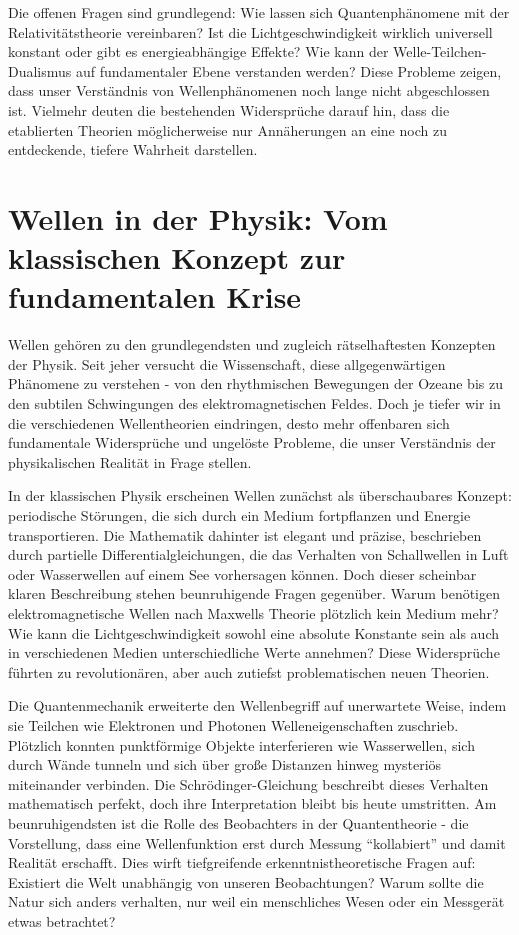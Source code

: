 Die offenen Fragen sind grundlegend: Wie lassen sich Quantenphänomene mit der Relativitätstheorie vereinbaren? Ist die Lichtgeschwindigkeit wirklich universell konstant oder gibt es
energieabhängige Effekte? Wie kann der Welle-Teilchen-Dualismus auf fundamentaler Ebene verstanden werden? Diese Probleme zeigen, dass unser Verständnis von Wellenphänomenen noch lange
nicht abgeschlossen ist. Vielmehr deuten die bestehenden Widersprüche darauf hin, dass die etablierten Theorien möglicherweise nur Annäherungen an eine noch zu entdeckende, tiefere
Wahrheit darstellen.

\section{Wellen in der Physik: Vom klassischen Konzept zur fundamentalen Krise}
Wellen gehören zu den grundlegendsten und zugleich rätselhaftesten Konzepten der Physik. Seit jeher versucht die Wissenschaft, diese allgegenwärtigen Phänomene zu verstehen - von den
rhythmischen Bewegungen der Ozeane bis zu den subtilen Schwingungen des elektromagnetischen Feldes. Doch je tiefer wir in die verschiedenen Wellentheorien eindringen, desto mehr offenbaren
sich fundamentale Widersprüche und ungelöste Probleme, die unser Verständnis der physikalischen Realität in Frage stellen.

In der klassischen Physik erscheinen Wellen zunächst als überschaubares Konzept: periodische Störungen, die sich durch ein Medium fortpflanzen und Energie transportieren. Die Mathematik
dahinter ist elegant und präzise, beschrieben durch partielle Differentialgleichungen, die das Verhalten von Schallwellen in Luft oder Wasserwellen auf einem See vorhersagen können.
Doch dieser scheinbar klaren Beschreibung stehen beunruhigende Fragen gegenüber. Warum benötigen elektromagnetische Wellen nach Maxwells Theorie plötzlich kein Medium mehr? Wie kann die
Lichtgeschwindigkeit sowohl eine absolute Konstante sein als auch in verschiedenen Medien unterschiedliche Werte annehmen? Diese Widersprüche führten zu revolutionären, aber auch zutiefst
problematischen neuen Theorien.

Die Quantenmechanik erweiterte den Wellenbegriff auf unerwartete Weise, indem sie Teilchen wie Elektronen und Photonen Welleneigenschaften zuschrieb. Plötzlich konnten punktförmige Objekte
interferieren wie Wasserwellen, sich durch Wände tunneln und sich über große Distanzen hinweg mysteriös miteinander verbinden. Die Schrödinger-Gleichung beschreibt dieses Verhalten mathematisch
perfekt, doch ihre Interpretation bleibt bis heute umstritten. Am beunruhigendsten ist die Rolle des Beobachters in der Quantentheorie - die Vorstellung, dass eine Wellenfunktion erst durch
Messung \enquote{kollabiert} und damit Realität erschafft. Dies wirft tiefgreifende erkenntnistheoretische Fragen auf: Existiert die Welt unabhängig von unseren Beobachtungen? Warum sollte die
Natur sich anders verhalten, nur weil ein menschliches Wesen oder ein Messgerät etwas betrachtet?

